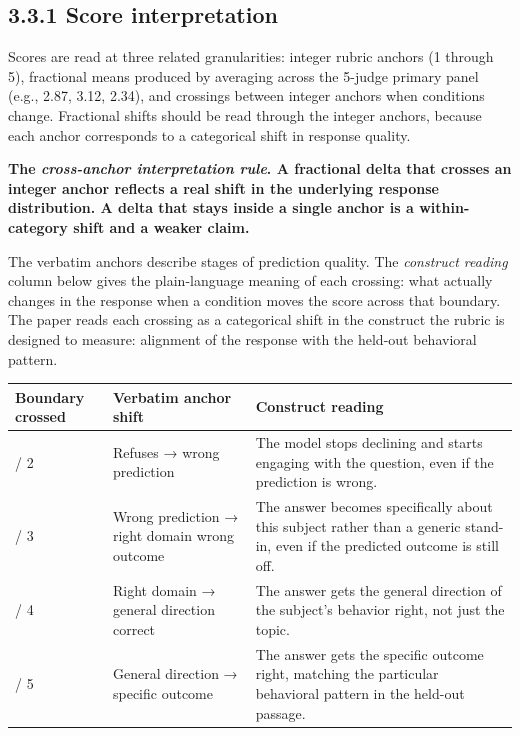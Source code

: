 \hypertarget{score-interpretation}{%
\subsection{3.3.1 Score interpretation}\label{score-interpretation}}

Scores are read at three related granularities: integer rubric anchors
(1 through 5), fractional means produced by averaging across the 5-judge
primary panel (e.g., 2.87, 3.12, 2.34), and crossings between integer
anchors when conditions change. Fractional shifts should be read through
the integer anchors, because each anchor corresponds to a categorical
shift in response quality.

\textbf{The \emph{cross-anchor interpretation rule}. A fractional delta
that crosses an integer anchor reflects a real shift in the underlying
response distribution. A delta that stays inside a single anchor is a
within-category shift and a weaker claim.}

The verbatim anchors describe stages of prediction quality. The
\emph{construct reading} column below gives the plain-language meaning
of each crossing: what actually changes in the response when a condition
moves the score across that boundary. The paper reads each crossing as a
categorical shift in the construct the rubric is designed to measure:
alignment of the response with the held-out behavioral pattern.

\begin{longtable}[]{@{}
  >{\raggedright\arraybackslash}p{}
  >{\raggedright\arraybackslash}p{}
  >{\raggedright\arraybackslash}p{}@{}}
\toprule
Boundary crossed & Verbatim anchor shift & Construct reading \\
\midrule
\endhead
1 / 2 & Refuses → wrong prediction & The model stops declining and
starts engaging with the question, even if the prediction is wrong. \\
2 / 3 & Wrong prediction → right domain wrong outcome & The answer
becomes specifically about this subject rather than a generic stand-in,
even if the predicted outcome is still off. \\
3 / 4 & Right domain → general direction correct & The answer gets the
general direction of the subject's behavior right, not just the
topic. \\
4 / 5 & General direction → specific outcome & The answer gets the
specific outcome right, matching the particular behavioral pattern in
the held-out passage. \\
\bottomrule
\end{longtable}

